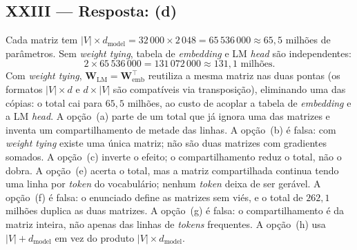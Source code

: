 \documentclass{dlproblemset}
\begin{document}
\subsection*{XXIII — Resposta: (d)}
Cada matriz tem $|V| \times d_\text{model} = 32\,000 \times 2\,048 = 65\,536\,000
\approx 65{,}5$ milhões de parâmetros. Sem \textit{weight tying}, tabela de
\textit{embedding} e LM \textit{head} são independentes:
\[
2 \times 65\,536\,000 = 131\,072\,000 \approx 131{,}1 \text{ milhões}.
\]
Com \textit{weight tying}, $\mathbf{W}_\text{LM} = \mathbf{W}_\text{emb}^\top$ reutiliza
a mesma matriz nas duas pontas (os formatos $|V| \times d$ e $d \times |V|$ são
compatíveis via transposição), eliminando uma das cópias: o total cai para $65{,}5$
milhões, ao custo de acoplar a tabela de \textit{embedding} e a LM \textit{head}.
A opção~(a) parte de um total que já ignora uma das matrizes e inventa um
compartilhamento de metade das linhas.
A opção~(b) é falsa: com \textit{weight tying} existe uma única matriz; não são duas
matrizes com gradientes somados.
A opção~(c) inverte o efeito; o compartilhamento reduz o total, não o dobra.
A opção~(e) acerta o total, mas a matriz compartilhada continua tendo uma linha por
\textit{token} do vocabulário; nenhum \textit{token} deixa de ser gerável.
A opção~(f) é falsa: o enunciado define as matrizes sem viés, e o total de $262{,}1$
milhões duplica as duas matrizes.
A opção~(g) é falsa: o compartilhamento é da matriz inteira, não apenas das linhas de
\textit{tokens} frequentes.
A opção~(h) usa $|V| + d_\text{model}$ em vez do produto $|V| \times d_\text{model}$.
\end{document}
